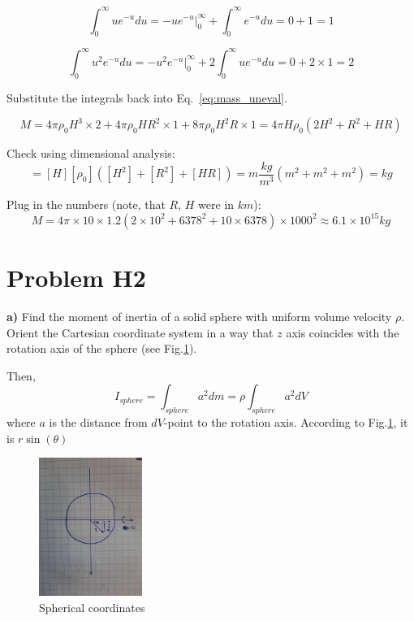 \documentclass{article}
\begin{document}
\begin{equation*}
  \int_0^\infty u e^{-u} du = -ue^{-u}|_0^\infty + \int_0^{\infty} e^{-u} du = 0 + 1 = 1
\end{equation*}

\begin{equation*}
  \int_0^\infty u^2 e^{-u} du = -u^2e^{-u}|_0^\infty + 2\int_0^{\infty} ue^{-u} du = 0 + 2 \times 1 = 2
\end{equation*}

Substitute the integrals back into Eq.~\eqref{eq:mass_uneval}.

\begin{equation*}
M = 4\pi \rho_0H^3 \times 2 + 4\pi \rho_0HR^2 \times 1 + 8\pi \rho_0H^2R \times 1 = 4 \pi H \rho_0 (2H^2 + R^2 + HR)
\end{equation*}

Check using dimensional analysis:
\begin{equation*}
  [M] = [H] [\rho_0] ([H^2] + [R^2] + [HR]) = m \frac{kg}{m^3} (m^2 + m^2 + m^2) = kg
\end{equation*}

Plug in the numbers (note, that $R$, $H$ were in $km$):
\begin{equation*}
  M = 4\pi \times 10 \times 1.2 (2 \times 10^2 + 6378^2 + 10 \times 6378) \times 1000^2 \approx 6.1 \times 10^{15} kg
\end{equation*}

\section{ Problem H2 }

\textbf{a)} Find the moment of inertia of a solid sphere with uniform volume velocity $\rho$. Orient the Cartesian coordinate system in a way that $z$ axis coincides with the rotation axis of the sphere (see Fig.\ref{fig:2a}).

Then,
\begin{equation*}
  I_{sphere} = \int_{sphere} a^2 dm = \rho \int_{sphere} a^2 dV
\end{equation*}
where $a$ is the distance from $dV$-point to the rotation axis. According to Fig.\ref{fig:2a}, it is $r\sin(\theta)$ 

\begin{figure}[H]
  \centering
  \includegraphics[width=0.3\textwidth, angle=90]{calculus/W5/img/2a}
  \caption{Spherical coordinates}
  \label{fig:2a}
\end{figure}
\end{document}
